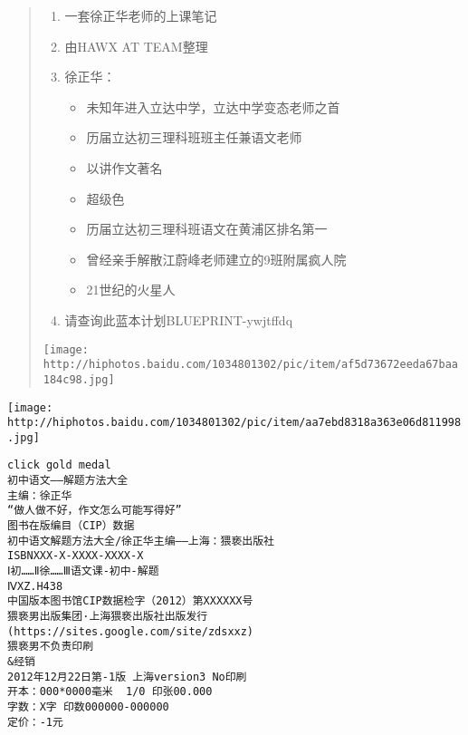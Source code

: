 \maketitle
\begin{abstract}
\begin{enumerate}
\item 一套徐正华老师的上课笔记
\item 由HAWX AT TEAM整理
\item 徐正华：
\begin{itemize}
\item 未知年进入立达中学，立达中学变态老师之首
\item 历届立达初三理科班班主任兼语文老师
\item 以讲作文著名
\item 超级色
\item 历届立达初三理科班语文在黄浦区排名第一
\item 曾经亲手解散江蔚峰老师建立的9班附属疯人院
\item 21世纪的火星人
\end{itemize}
\item 请查询此蓝本计划BLUEPRINT-ywjtffdq
\end{enumerate}
\begin{center}
\texttt{[image: http://hiphotos.baidu.com/1034801302/pic/item/af5d73672eeda67baa184c98.jpg]}
\end{center}
\end{abstract}
\newpage
\begin{center}
\texttt{[image: http://hiphotos.baidu.com/1034801302/pic/item/aa7ebd8318a363e06d811998.jpg]}
\end{center}
\begin{verbatim}
click gold medal
初中语文——解题方法大全
主编：徐正华
“做人做不好，作文怎么可能写得好”
图书在版编目（CIP）数据
初中语文解题方法大全/徐正华主编——上海：猥亵出版社
ISBNXXX-X-XXXX-XXXX-X
Ⅰ初……Ⅱ徐……Ⅲ语文课-初中-解题
ⅣXZ.H438
中国版本图书馆CIP数据检字（2012）第XXXXXX号
猥亵男出版集团·上海猥亵出版社出版发行
(https://sites.google.com/site/zdsxxz)
猥亵男不负责印刷
&经销
2012年12月22日第-1版 上海version3 No印刷
开本：000*0000毫米  1/0 印张00.000
字数：X字 印数000000-000000
定价：-1元
\end{verbatim}
\newpage 